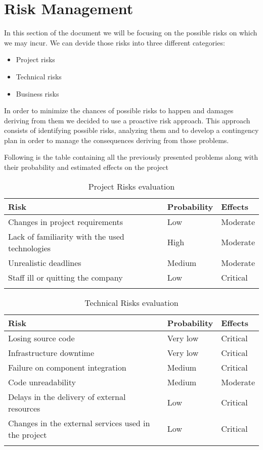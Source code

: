 \section{Risk Management}

In this section of the document we will be focusing on the possible risks on
which we may incur. We can devide those risks into three different categories:

\begin{itemize}
	\item Project risks
	\item Technical risks
	\item Business risks
\end{itemize}

In order to minimize the chances of possible risks to happen and damages
deriving from them we decided to use a proactive risk approach. This approach
consists of identifying possible risks, analyzing them and to develop a
contingency plan in order to manage the consequences deriving from those
problems.





Following is the table containing all the previously presented problems along
with their probability and estimated effects on the project

\begin{longtable}{ |l|l|l| }
	\hline
	\textbf{Risk} & \textbf{Probability} & \textbf{Effects}\\
  \hline
	Changes in project requirements
	&
	Low
	&
	Moderate \\
  \hline
	Lack of familiarity with the used technologies
	&
	High
	&
	Moderate \\
  \hline
	Unrealistic deadlines
	&
	Medium
	&
	Moderate \\
  \hline
	Staff ill or quitting the company
	&
	Low
	&
	Critical \\
  \hline
	\caption{Project Risks evaluation}
\end{longtable}

\begin{longtable}{ |l|l|l| }
	\hline
	\textbf{Risk} & \textbf{Probability} & \textbf{Effects}\\
  \hline
	Losing source code
	&
	Very low
	&
	Critical \\
  \hline
	Infrastructure downtime
	&
	Very low
	&
	Critical \\
  \hline
	Failure on component integration
	&
	Medium
	&
	Critical \\
  \hline
	Code unreadability
	&
	Medium
	&
	Moderate \\
  \hline
	Delays in the delivery of external resources
	&
	Low
	&
	Critical \\
  \hline
	Changes in the external services used in the project
	&
	Low
	&
	Critical \\
  \hline
	\caption{Technical Risks evaluation}
\end{longtable}

